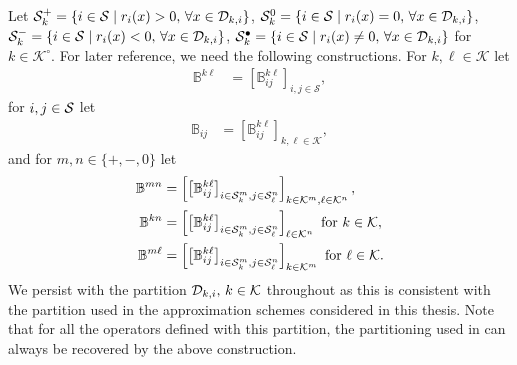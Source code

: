 Let \(\mathcal{S}_k^+=\{i\in\mathcal{S}\mid r_i(x)>0,\,\forall x \in\mathcal{D}_{k,i}\}\), \(\mathcal{S}_k^0=\{i\in\mathcal{S}\mid r_i(x)=0,\,\forall x \in\mathcal{D}_{k,i}\}\), \(\mathcal{S}_k^-=\{i\in\mathcal{S}\mid r_i(x)<0,\,\forall x \in\mathcal{D}_{k,i}\}\), \(\mathcal{S}_k^\bullet=\{i\in\mathcal{S}\mid r_i(x)\neq0,\,\forall x \in\mathcal{D}_{k,i}\}\) for \(k\in\mathcal K^\circ\). For later reference, we need the following constructions. For \(k,\ell\in\mathcal K\) let
\begin{align}
	\mathbb B^{k\ell} & = \left[\mathbb B_{ij}^{k\ell}\right]_{i,j\in\mathcal S},\label{eqn:ref1here}
\end{align}
for \(i,j\in\mathcal{S}\) let 
\begin{align}
	\mathbb B_{ij} & = \left[\mathbb B_{ij}^{k\ell}\right]_{k,\ell \in \mathcal K},
\end{align}
and for \(m,n\in\{+,-,0\}\) let
\begin{align}
	\mathbb B^{m n} &= \left[\left[\mathbb B_{ij}^{k\ell}\right]_{i\in\mathcal{S}_k^m,j\in\mathcal{S}_\ell^n}\right]_{k\in\mathcal K^m,\ell\in\mathcal K^n},\label{eqn: Bmn2 etc}
	\\ \mathbb B^{k n} &= \left[\left[\mathbb B_{ij}^{k\ell}\right]_{i\in\mathcal{S}_k^m,j\in\mathcal{S}_\ell^n}\right]_{\ell\in\mathcal K^n} \mbox{ for }k\in\mathcal K,
	\\ \mathbb B^{m \ell} &= \left[\left[\mathbb B_{ij}^{k\ell}\right]_{i\in\mathcal{S}_k^m,j\in\mathcal{S}_\ell^n}\right]_{k\in\mathcal K^m} \mbox{ for } \ell\in\mathcal K.
	\label{eqn:ref2here}
\end{align}
We persist with the partition \(\mathcal{D}_{k,i},\,k\in\mathcal K\) throughout as this is consistent with the partition used in the approximation schemes considered in this thesis. Note that for all the operators defined with this partition, the partitioning used in \citep{bo2014} can always be recovered by the above construction. 

